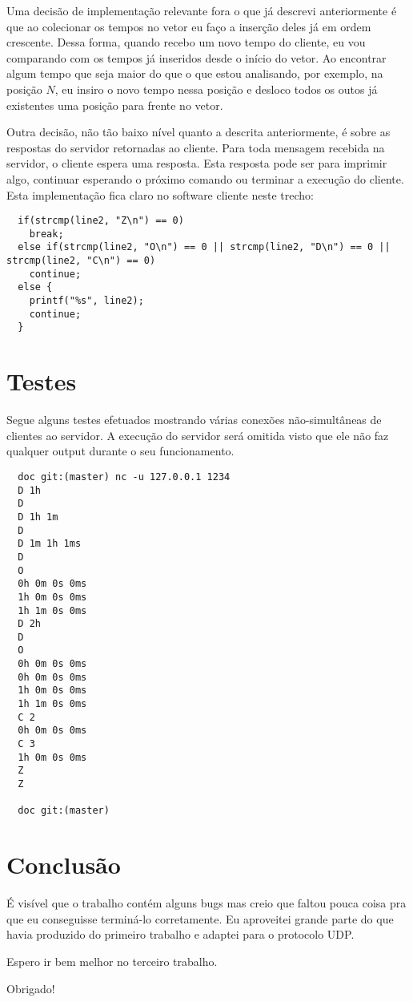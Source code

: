 \documentclass[12pt]{article}
\begin{document}
Uma decisão de implementação relevante fora o que já descrevi
anteriormente é que ao colecionar os tempos no vetor eu faço a inserção deles já
em ordem crescente. Dessa forma, quando recebo um novo tempo do cliente, eu
vou comparando com os tempos já inseridos desde o início do vetor. Ao encontrar
algum tempo que seja maior do que o que estou analisando, por exemplo, na
posição $N$, eu insiro o novo tempo nessa posição e desloco todos os outos já
existentes uma posição para frente no vetor.

Outra decisão, não tão baixo nível quanto a descrita anteriormente, é sobre as
respostas do servidor retornadas ao cliente. Para toda mensagem recebida na
servidor, o cliente espera uma resposta. Esta resposta pode ser para imprimir
algo, continuar esperando o próximo comando ou terminar a execução do cliente.
Esta implementação fica claro no software cliente neste trecho:

\begin{verbatim}
  if(strcmp(line2, "Z\n") == 0)
    break;
  else if(strcmp(line2, "O\n") == 0 || strcmp(line2, "D\n") == 0 || strcmp(line2, "C\n") == 0)
    continue;
  else {
    printf("%s", line2);
    continue;
  }
\end{verbatim}


\section{Testes}
Segue alguns testes efetuados mostrando várias conexões não-simultâneas de
clientes ao servidor. A execução do servidor será omitida visto que ele não
faz qualquer output durante o seu funcionamento.

\begin{verbatim}
  doc git:(master) nc -u 127.0.0.1 1234
  D 1h
  D
  D 1h 1m
  D
  D 1m 1h 1ms
  D
  O
  0h 0m 0s 0ms
  1h 0m 0s 0ms
  1h 1m 0s 0ms
  D 2h
  D
  O
  0h 0m 0s 0ms
  0h 0m 0s 0ms
  1h 0m 0s 0ms
  1h 1m 0s 0ms
  C 2
  0h 0m 0s 0ms
  C 3
  1h 0m 0s 0ms
  Z
  Z

  doc git:(master)
\end{verbatim}

\section{Conclusão}

É visível que o trabalho contém alguns bugs mas creio que faltou pouca coisa
pra que eu conseguisse terminá-lo corretamente. Eu aproveitei grande parte do
que havia produzido do primeiro trabalho e adaptei para o protocolo UDP.

Espero ir bem melhor no terceiro trabalho.

Obrigado!
\end{document}

